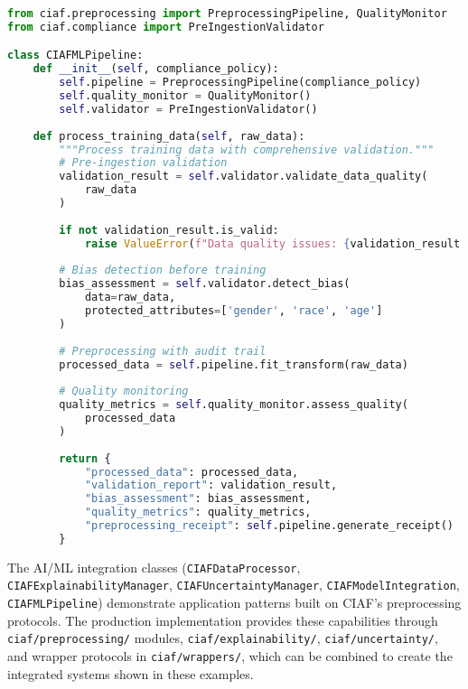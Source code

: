 \documentclass[12pt,a4paper]{article}
\begin{document}
\begin{lstlisting}[language=Python, caption=ML Pipeline Integration]
from ciaf.preprocessing import PreprocessingPipeline, QualityMonitor
from ciaf.compliance import PreIngestionValidator

class CIAFMLPipeline:
    def __init__(self, compliance_policy):
        self.pipeline = PreprocessingPipeline(compliance_policy)
        self.quality_monitor = QualityMonitor()
        self.validator = PreIngestionValidator()
    
    def process_training_data(self, raw_data):
        """Process training data with comprehensive validation."""
        # Pre-ingestion validation
        validation_result = self.validator.validate_data_quality(
            raw_data
        )
        
        if not validation_result.is_valid:
            raise ValueError(f"Data quality issues: {validation_result.issues}")
        
        # Bias detection before training
        bias_assessment = self.validator.detect_bias(
            data=raw_data,
            protected_attributes=['gender', 'race', 'age']
        )
        
        # Preprocessing with audit trail
        processed_data = self.pipeline.fit_transform(raw_data)
        
        # Quality monitoring
        quality_metrics = self.quality_monitor.assess_quality(
            processed_data
        )
        
        return {
            "processed_data": processed_data,
            "validation_report": validation_result,
            "bias_assessment": bias_assessment,
            "quality_metrics": quality_metrics,
            "preprocessing_receipt": self.pipeline.generate_receipt()
        }
\end{lstlisting}

\begin{tcolorbox}[colframe=blue!70, colback=green!8, title={\textbf{Implementation Note}}]
The AI/ML integration classes (\texttt{CIAFDataProcessor}, \texttt{CIAFExplainabilityManager}, \texttt{CIAFUncertaintyManager}, \texttt{CIAFModelIntegration}, \texttt{CIAFMLPipeline}) demonstrate application patterns built on CIAF's preprocessing protocols. The production implementation provides these capabilities through \texttt{ciaf/preprocessing/} modules, \texttt{ciaf/explainability/}, \texttt{ciaf/uncertainty/}, and wrapper protocols in \texttt{ciaf/wrappers/}, which can be combined to create the integrated systems shown in these examples.
\end{tcolorbox}
\end{document}
